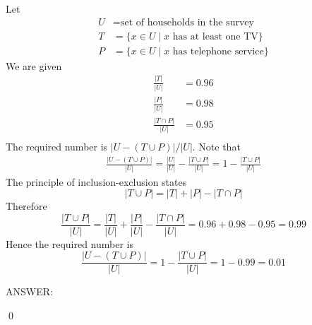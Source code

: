 Let
\begin{align*}
U &= \text{set of households in the survey} \\
T &= \{x \in U \mid x \text{ has at least one TV} \} \\
P &= \{x \in U \mid x \text{ has telephone service} \} 
\end{align*}
We are given
\begin{align*}
\frac{|T|}{|U|} &= 0.96 \\
\frac{|P|}{|U|} &= 0.98 \\
\frac{|T \cap P|}{|U|} &= 0.95 \\
\end{align*}
The required number is $|U - (T \cup P)|/|U|$.
Note that 
\begin{align*}
\frac{|U - (T \cup P)|}{|U|}
= \frac{|U|}{|U|} - \frac{|T \cup P|}{|U|} = 1 - \frac{|T \cup P|}{|U|} 
\end{align*}
The principle of inclusion-exclusion states
\[
|T \cup P| = |T| + |P| - |T \cap P|
\]
Therefore
\[
\frac{|T \cup P|}{|U|} = \frac{|T|}{|U|} + \frac{|P|}{|U|} 
- \frac{|T \cap P|}{|U|} 
= 0.96 + 0.98 - 0.95 = 0.99
\]
Hence the required number is 
\[
\frac{|U - (T \cup P)|}{|U|}
= 1 - \frac{|T \cup P|}{|U|} 
= 1 - 0.99 = 0.01
\]

ANSWER:

\qed


